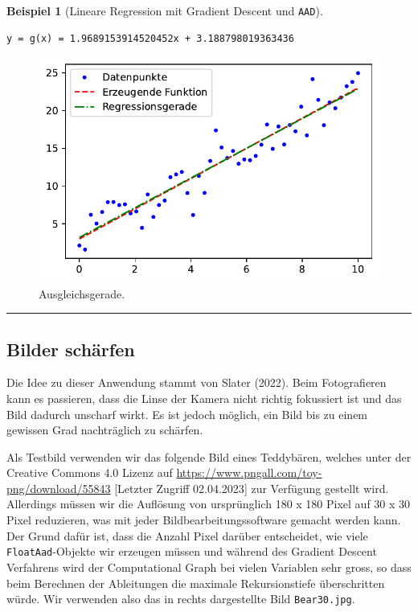 \documentclass[
  a4paper,
  DIV=11]{scrreprt}
\theoremstyle{definition}
\theoremstyle{definition}
\newtheorem{example}{Beispiel}[chapter]
\theoremstyle{remark}
\begin{document}
\begin{example}[Lineare Regression mit Gradient Descent und
\texttt{AAD}]
\begin{verbatim}
y = g(x) = 1.9689153914520452x + 3.188798019363436
\end{verbatim}

\begin{figure}[H]

{\centering \includegraphics{aad_files/figure-pdf/fig-graphoflinearregression-output-2.pdf}

}

\caption{\label{fig-graphoflinearregression}Ausgleichsgerade.}

\end{figure}

\end{example}

\begin{center}\rule{0.5\linewidth}{0.5pt}\end{center}

\hypertarget{sec-deblurringImages}{%
\subsection{Bilder schärfen}\label{sec-deblurringImages}}

Die Idee zu dieser Anwendung stammt von Slater (2022). Beim
Fotografieren kann es passieren, dass die Linse der Kamera nicht richtig
fokussiert ist und das Bild dadurch unscharf wirkt. Es ist jedoch
möglich, ein Bild bis zu einem gewissen Grad nachträglich zu schärfen.

Als Testbild verwenden wir das folgende Bild eines Teddybären, welches
unter der Creative Commons 4.0 Lizenz auf
\url{https://www.pngall.com/toy-png/download/55843} {[}Letzter Zugriff
02.04.2023{]} zur Verfügung gestellt wird. Allerdings müssen wir die
Auflösung von ursprünglich 180 x 180 Pixel auf 30 x 30 Pixel reduzieren,
was mit jeder Bildbearbeitungssoftware gemacht werden kann. Der Grund
dafür ist, dass die Anzahl Pixel darüber entscheidet, wie viele
\texttt{FloatAad}-Objekte wir erzeugen müssen und während des Gradient
Descent Verfahrens wird der Computational Graph bei vielen Variablen
sehr gross, so dass beim Berechnen der Ableitungen die maximale
Rekursionstiefe überschritten würde. Wir verwenden also das in rechts
dargestellte Bild \texttt{Bear30.jpg}.
\end{document}
